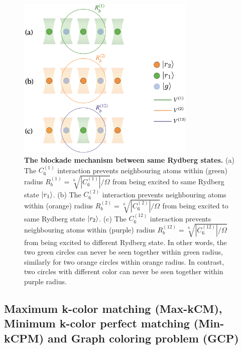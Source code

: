 \documentclass[%
 reprint,
nofootinbib,
 amsmath,amssymb,
 aps,
floatfix,
]{revtex4-2}
\begin{document}
\begin{figure}[ht!]
    \centering
    \includegraphics[width=8.5cm]{picture/Blockade_Mech.png}
    \caption{\textbf{The blockade mechanism between same Rydberg states.} (a) The $C^{(1)}_6$ interaction prevents neighbouring atoms within (green) radius $R^{(1)}_b = \sqrt[6]{|C^{(1)}_6|/\Omega}$ from being excited to same Rydberg state $\ket{r_1}$. (b) The $C^{(2)}_6$ interaction prevents neighbouring atoms within (orange) radius $R^{(2)}_b = \sqrt[6]{|C^{(2)}_6|/\Omega}$ from being excited to same Rydberg state $\ket{r_2}$. (c) The $C^{(12)}_6$ interaction prevents neighbouring atoms within (purple) radius $R^{(12)}_b = \sqrt[6]{|C^{(12)}_6|/\Omega}$ from being excited to different Rydberg state. In other words, the two green circles can never be seen together within green radius, similarly for two orange circles within orange radius. In contrast, two circles with different color can never be seen together within purple radius.}
    \label{fig:blockade}
\end{figure}

 
\subsection{Maximum k-color matching (Max-kCM), Minimum k-color perfect matching (Min-kCPM) and Graph coloring problem (GCP)}
\end{document}
